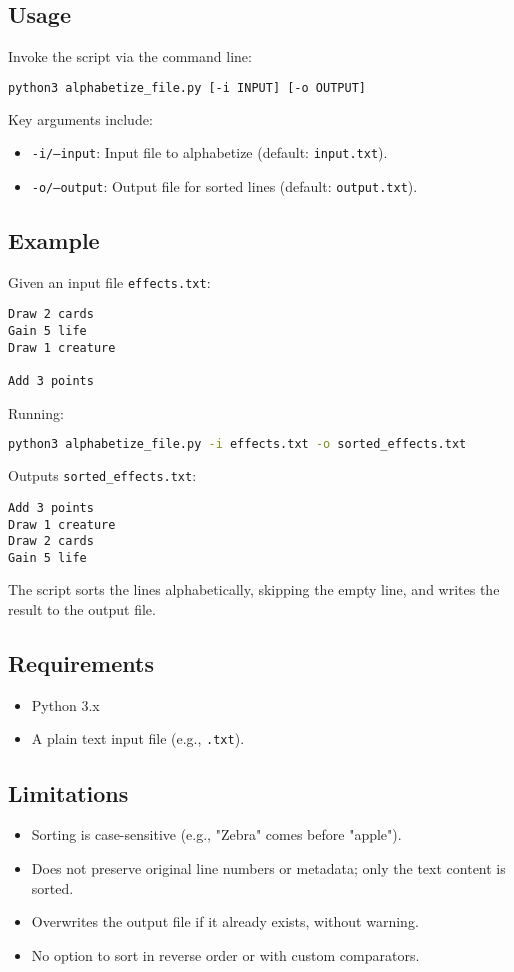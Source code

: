 \subsection{Usage}
Invoke the script via the command line:
\begin{lstlisting}[language=bash]
python3 alphabetize_file.py [-i INPUT] [-o OUTPUT]
\end{lstlisting}
Key arguments include:
\begin{itemize}
    \item \texttt{-i/--input}: Input file to alphabetize (default: \texttt{input.txt}).
    \item \texttt{-o/--output}: Output file for sorted lines (default: \texttt{output.txt}).
\end{itemize}

\subsection{Example}
Given an input file \texttt{effects.txt}:
\begin{lstlisting}
Draw 2 cards
Gain 5 life
Draw 1 creature

Add 3 points
\end{lstlisting}
Running:
\begin{lstlisting}[language=bash]
python3 alphabetize_file.py -i effects.txt -o sorted_effects.txt
\end{lstlisting}
Outputs \texttt{sorted\_effects.txt}:
\begin{lstlisting}
Add 3 points
Draw 1 creature
Draw 2 cards
Gain 5 life
\end{lstlisting}
The script sorts the lines alphabetically, skipping the empty line, and writes the result to the output file.

\subsection{Requirements}
\begin{itemize}
    \item Python 3.x
    \item A plain text input file (e.g., \texttt{.txt}).
\end{itemize}

\subsection{Limitations}
\begin{itemize}
    \item Sorting is case-sensitive (e.g., "Zebra" comes before "apple").
    \item Does not preserve original line numbers or metadata; only the text content is sorted.
    \item Overwrites the output file if it already exists, without warning.
    \item No option to sort in reverse order or with custom comparators.
\end{itemize}












